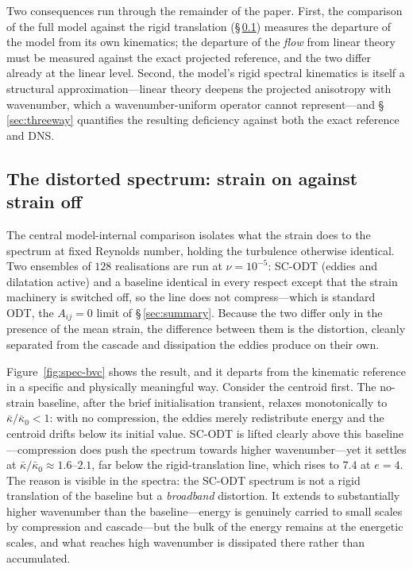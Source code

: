 \documentclass[lineno]{JFM-FLM_Au}
\begin{document}
Two consequences run through the remainder of the paper. First, the
comparison of the full model against the rigid translation
(\S\,\ref{sec:spec-bvc}) measures the departure of the model from its own
kinematics; the departure of the \emph{flow} from linear theory must be
measured against the exact projected reference, and the two differ already
at the linear level. Second, the model's rigid spectral kinematics is
itself a structural approximation---linear theory deepens the projected
anisotropy with wavenumber, which a wavenumber-uniform operator cannot
represent---and \S\,\ref{sec:threeway} quantifies the resulting deficiency
against both the exact reference and DNS.




\subsection{The distorted spectrum: strain on against strain
off}\label{sec:spec-bvc}

The central model-internal comparison isolates what the strain does to
the spectrum at fixed Reynolds number, holding the turbulence otherwise
identical. Two ensembles of $128$ realisations are run at $\nu=10^{-5}$:
SC-ODT (eddies and dilatation active) and a baseline identical
in every respect except that the strain machinery is switched off, so
the line does not compress---which is standard ODT, the $A_{ij}=0$
limit of \S\,\ref{sec:summary}. Because the two differ only in the presence
of the mean strain, the difference between them is the distortion,
cleanly separated from the cascade and dissipation the eddies produce on
their own.

Figure~\ref{fig:spec-bvc} shows the result, and it departs from the
kinematic reference in a specific and physically meaningful way.
Consider the centroid first. The no-strain baseline, after the brief
initialisation transient, relaxes monotonically to
$\bar\kappa/\bar\kappa_0<1$: with no compression, the eddies merely
redistribute energy and the centroid drifts below its initial value.
SC-ODT is lifted clearly above this baseline---compression does push
the spectrum towards higher wavenumber---yet it settles at
$\bar\kappa/\bar\kappa_0\approx1.6$--$2.1$, far below the
rigid-translation line, which rises to $7.4$ at $e=4$. The reason is
visible in the spectra: the SC-ODT spectrum is not a rigid
translation of the baseline but a \emph{broadband} distortion. It
extends to substantially higher wavenumber than the baseline---energy is
genuinely carried to small scales by compression and cascade---but the
bulk of the energy remains at the energetic scales, and what reaches
high wavenumber is dissipated there rather than accumulated.
\end{document}

